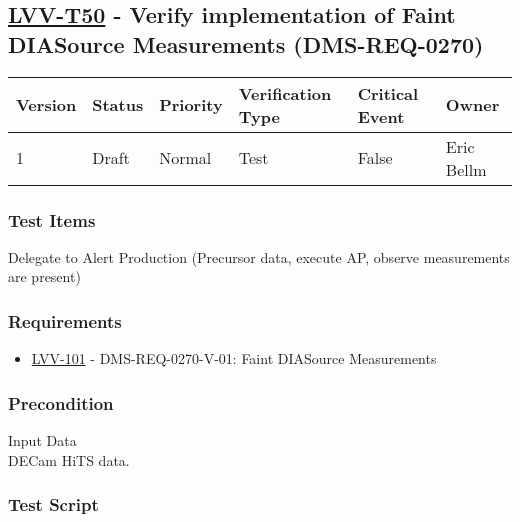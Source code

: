 \hypertarget{lvv-t50---verify-implementation-of-faint-diasource-measurements-dms-req-0270}{%
\subsection{\texorpdfstring{\href{https://jira.lsstcorp.org/secure/Tests.jspa\#/testCase/LVV-T50}{LVV-T50}
- Verify implementation of Faint DIASource Measurements
(DMS-REQ-0270)}{LVV-T50 - Verify implementation of Faint DIASource Measurements (DMS-REQ-0270)}}\label{lvv-t50---verify-implementation-of-faint-diasource-measurements-dms-req-0270}}

\begin{longtable}[]{@{}llllll@{}}
\toprule
Version & Status & Priority & Verification Type & Critical Event &
Owner\tabularnewline
\midrule
\endhead
1 & Draft & Normal & Test & False & Eric Bellm\tabularnewline
\bottomrule
\end{longtable}

\hypertarget{test-items-26}{%
\subsubsection{Test Items}\label{test-items-26}}

Delegate to Alert Production (Precursor data, execute AP, observe
measurements are present)

\hypertarget{requirements-27}{%
\subsubsection{Requirements}\label{requirements-27}}

\begin{itemize}
\tightlist
\item
  \href{https://jira.lsstcorp.org/browse/LVV-101}{LVV-101} -
  DMS-REQ-0270-V-01: Faint DIASource Measurements
\end{itemize}

\hypertarget{precondition-1}{%
\subsubsection{Precondition}\label{precondition-1}}

Input Data\\
\hspace*{0.333em}DECam HiTS data.

\hypertarget{test-script-27}{%
\subsubsection{Test Script}\label{test-script-27}}


